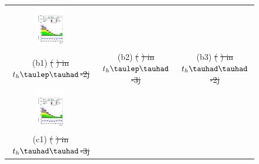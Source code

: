 \documentclass[PAPER, coverpage, atlasdraft=true, texlive=2016, UKenglish]{\ATLASLATEXPATH atlasdoc}
\providecommand{\DIFdel}[1]{{\protect\color{red}\sout{#1}}}                      %
\providecommand{\DIFdelFL}[1]{\DIFdel{#1}} %
\providecommand{\DIFaddbeginFL}{} %
\providecommand{\DIFaddendFL}{} %
\providecommand{\DIFdelbeginFL}{} %
\providecommand{\DIFdelendFL}{} %
\begin{document}
\begin{figure}[H]
\begin{tabular}{@{}ccc@{}}
\DIFdelbeginFL %
\DIFdelendFL \DIFaddbeginFL \includegraphics[page=1,width=0.33\textwidth]{figures/new_pt/reg2mtau1b2jos_vetobtagwp70_highmet.pdf}\DIFaddendFL \\
(b1) \DIFdelbeginFL %
\DIFdelFL{(}%
\DIFdelFL{) in $t_h\tlhad$-2j }\DIFdelendFL & (b2) \DIFdelbeginFL %
\DIFdelFL{(}%
\DIFdelFL{) in  $t_h\tlhad$-3j }\DIFdelendFL & (b3) \DIFdelbeginFL %
\DIFdelFL{(}%
\DIFdelFL{) in $t_h\thadhad$-2j }\DIFdelendFL \\
\DIFdelbeginFL %
\DIFdelendFL %
\DIFaddbeginFL \includegraphics[page=1,width=0.33\textwidth]{figures/new_pt/reg2mtau1b3jos_vetobtagwp70_highmet.pdf}\DIFaddendFL &\\
(c1) \DIFdelbeginFL %
\DIFdelFL{(}%
\DIFdelFL{) in $t_h\thadhad$-3j}\DIFdelendFL \\

\end{tabular}
\end{figure}
\end{document}
